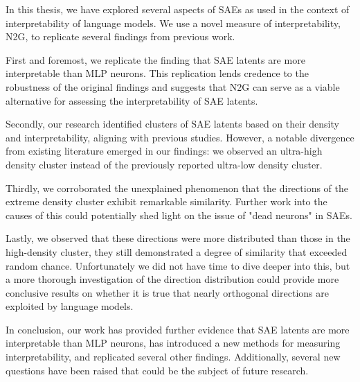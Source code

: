 In this thesis, we have explored several aspects of SAEs as used in the context of interpretability of language models.
We use a novel measure of interpretability, N2G, to replicate several findings from previous work.

First and foremost, we replicate the finding that SAE latents are more interpretable than MLP neurons.
This replication lends credence to the robustness of the original findings and suggests that N2G can serve as a viable alternative for assessing the interpretability of SAE latents.

Secondly, our research identified clusters of SAE latents based on their density and interpretability, aligning with previous studies.
However, a notable divergence from existing literature emerged in our findings: we observed an ultra-high density cluster instead of the previously reported ultra-low density cluster. 

Thirdly, we corroborated the unexplained phenomenon that the directions of the extreme density cluster exhibit remarkable similarity.
Further work into the causes of this could potentially shed light on the issue of "dead neurons" in SAEs.

Lastly, we observed that these directions were more distributed than those in the high-density cluster, they still demonstrated a degree of similarity that exceeded random chance.
Unfortunately we did not have time to dive deeper into this, but a more thorough investigation of the direction distribution could provide more conclusive results on whether it is true that nearly orthogonal directions are exploited by language models.

In conclusion, our work has provided further evidence that SAE latents are more interpretable than MLP neurons, has introduced a new methods for measuring interpretability, and replicated several other findings.
Additionally, several new questions have been raised that could be the subject of future research.
